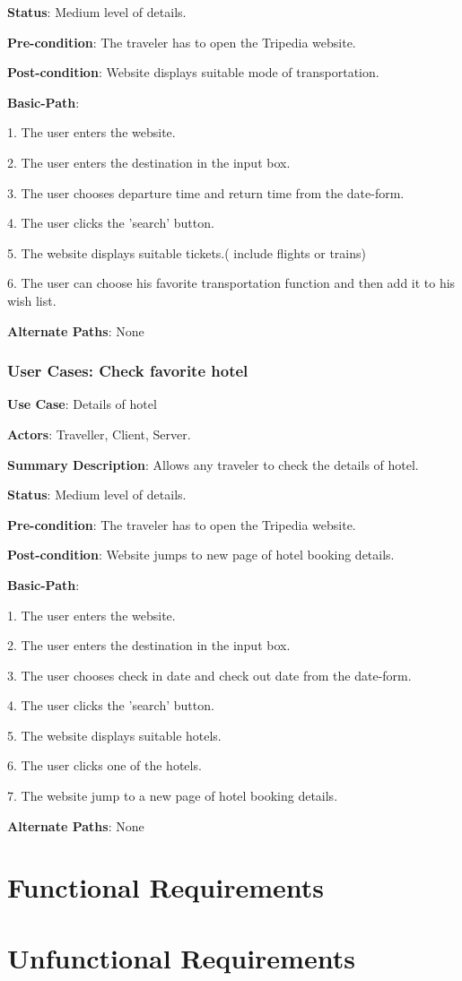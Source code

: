 \documentclass[conference]{IEEEtran}
\begin{document}
\textbf{Status}: Medium level of details.

\textbf{Pre-condition}: The traveler has to open the Tripedia website.

\textbf{Post-condition}: Website displays suitable mode of transportation.

\textbf{Basic-Path}:

1. The user enters the website.

2. The user enters the destination in the input box.

3. The user chooses departure time and return time from the date-form.

4. The user clicks the 'search' button.

5. The website displays suitable tickets.( include flights or trains)

6. The user can choose his favorite transportation function and then add it to his wish list.

\textbf{Alternate Paths}: None

\subsubsection{User Cases: Check favorite hotel}

\textbf{ }

\textbf{Use Case}: Details of hotel

\textbf{Actors}: Traveller, Client, Server.

\textbf{Summary Description}: Allows any traveler to check the details of hotel.

\textbf{Status}: Medium level of details.

\textbf{Pre-condition}: The traveler has to open the Tripedia website.

\textbf{Post-condition}: Website jumps to new page of hotel booking details.

\textbf{Basic-Path}:

1. The user enters the website.

2. The user enters the destination in the input box.

3. The user chooses check in date and check out date from the date-form.

4. The user clicks the 'search' button.

5. The website displays suitable hotels.

6. The user clicks one of the hotels.

7. The website jump to a new page of hotel booking details.

\textbf{Alternate Paths}: None

\section{Functional Requirements}



\section{Unfunctional Requirements}
\end{document}
